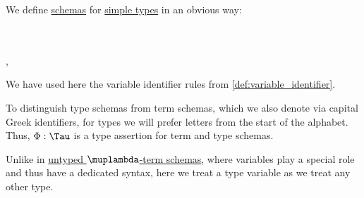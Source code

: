 \begin{definition}\label{def:simple_type_schema}
  We define \hyperref[con:schemas_and_instances]{schemas} for \hyperref[def:simple_type]{simple types} in an obvious way:
  \begin{bnf*}
           {} \\
     {\bnftsq{(} \bnfsp {} \bnfsp \bnftsq{\( \synimplies \)} \bnfsp {} \bnfsp \bnftsq{)}} \\
                { \bnfor {} \bnfor }, \\
  \end{bnf*}

  We have used here the variable identifier rules from \cref{def:variable_identifier}.
\end{definition}
\begin{comments}
  \item To distinguish type schemas from term schemas, which we also denote via capital Greek identifiers, for types we will prefer letters from the start of the alphabet. Thus, \( \Phi: \Tau \) is a type assertion for term and type schemas.

  \item Unlike in \hyperref[def:lambda_term_schema]{untyped \( \muplambda \)-term schemas}, where variables play a special role and thus have a dedicated syntax, here we treat a type variable as we treat any other type.
\end{comments}

